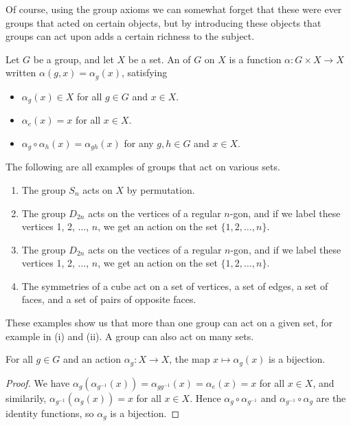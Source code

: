 \documentclass[a4]{scrreprt}
\begin{document}
Of course, using the group axioms we can somewhat forget that these were ever groups that acted on certain objects, but by introducing these objects that groups can act upon adds a certain richness to the subject.

\begin{definition}
Let $G$ be a group, and let $X$ be a set. An  of $G$ on $X$ is a function $\alpha : G \times X \rightarrow X$ written $\alpha(g, x) = \alpha_g(x)$, satisfying
\begin{itemize}
	\item $\alpha_g(x) \in X$ for all $g \in G$ and $x \in X$.
	\item $\alpha_e(x) = x$ for all $x \in X$.
	\item $\alpha_g \circ \alpha_h (x) = \alpha_{gh}(x)$ for any $g, h \in G$ and $x \in X$.
\end{itemize}
\end{definition}

\begin{example}
The following are all examples of groups that act on various sets.
\begin{enumerate}[label=(\roman*)]
	\item The group $S_n$ acts on $X$ by permutation.
	\item The group $D_{2n}$ acts on the vertices of a regular $n$-gon, and if we label these vertices 1, 2, $\dots$, $n$, we get an action on the set $\{1, 2, \dots, n\}$.
	\item The group $D_{2n}$ acts on the vectices of a regular $n$-gon, and if we label these vertices 1, 2, $\dots$, $n$, we get an action on the set $\{1, 2, \dots, n\}$.
	\item The symmetries of a cube act on a set of vertices, a set of edges, a set of faces, and a set of pairs of opposite faces.
\end{enumerate}
\end{example}

\begin{remark}
	These examples show us that more than one group can act on a given set, for example in (i) and (ii). A group can also act on many sets.
\end{remark}

\begin{lemma}\label{lemma:bijection}
	For all $g \in G$ and an action $\alpha_g: X \rightarrow X$, the map $x \mapsto \alpha_g(x)$ is a bijection.
\end{lemma}
\begin{proof}
	We have $\alpha_g(\alpha_{g^{-1}}(x)) = \alpha_{g g^{-1}}(x) = \alpha_e(x) = x$ for all $x \in X$, and similarily, $\alpha_{g^{-1}}(\alpha_g(x)) = x$ for all $x \in X$. Hence $\alpha_g \circ \alpha_{g^{-1}}$ and $\alpha_{g^{-1}} \circ \alpha_{g}$ are the identity functions, so $\alpha_g$ is a bijection.
\end{proof}
\end{document}
